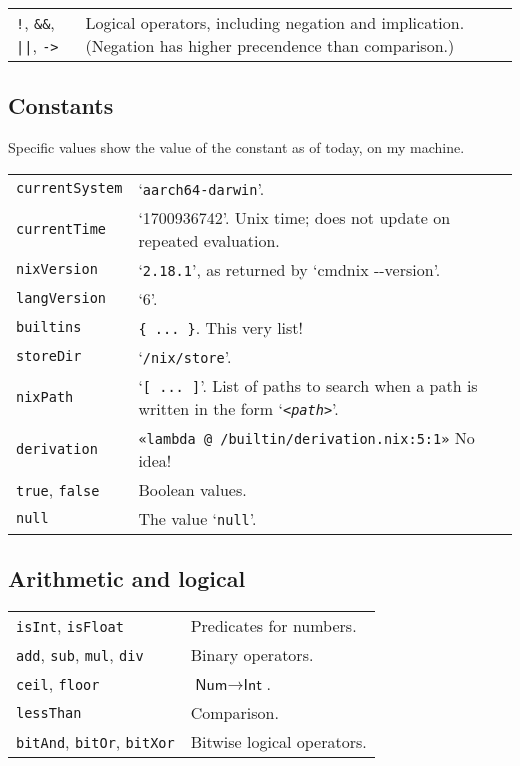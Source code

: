 \documentclass[9pt, a4paper, landscape]{extarticle}
\newcommand{\cmd}[1]{\texttt{#1}}
\newcommand{\itg}{\textsf{Int}} %
\newcommand{\num}{\textsf{Num}} %
\begin{document}
\begin{multicols*}{3}
\begin{tabularx}{\columnwidth}{@{}l>{\raggedright\arraybackslash}X@{}}
  \cmd{!}, \cmd{\&\&}, \cmd{||}, \cmd{->} & Logical operators,
  including negation and implication. (Negation has higher precendence
  than comparison.) \\
\end{tabularx}

\columnbreak
\subsection*{Constants}
Specific values show the value of the constant as of today, on my
machine.

\begin{tabularx}{\columnwidth}{@{}l>{\raggedright\arraybackslash}X@{}}
  \cmd{currentSystem} & `\cmd{aarch64-darwin}'. \\
  \cmd{currentTime} & `1700936742'. Unix time; does not update on repeated
  evaluation. \\
  \cmd{nixVersion} & `\cmd{2.18.1}', as returned by `cmd{nix -{}-version}'. \\
  \cmd{langVersion} & `6'. \\
  \cmd{builtins} & \cmd{\{\ ...\ \}}. This very list! \\
  \cmd{storeDir} & `\cmd{/nix/store}'. \\
  \cmd{nixPath} & `\cmd{[\ ...\ ]}'. List of paths to search when a path is
  written in the form `\cmd{<\emph{path}>}'.  \\
  \cmd{derivation} & \cmd{«lambda @ /builtin/derivation.nix:5:1»} No
  idea! \\
  \cmd{true}, \cmd{false} & Boolean values. \\
  \cmd{null} & The value `\cmd{null}'. \\
\end{tabularx}

\subsection*{Arithmetic and logical}
\begin{tabularx}{\columnwidth}{@{}l>{\raggedright\arraybackslash}X@{}}
  \cmd{isInt}, \cmd{isFloat} & Predicates for numbers. \\
  \cmd{add}, \cmd{sub}, \cmd{mul}, \cmd{div} &  Binary operators. \\ 
  \cmd{ceil}, \cmd{floor} & $\num\to\itg$. \\
  \cmd{lessThan} & Comparison. \\
  \cmd{bitAnd}, \cmd{bitOr}, \cmd{bitXor} & Bitwise logical operators. \\
\end{tabularx}


\end{multicols*}
\end{document}
